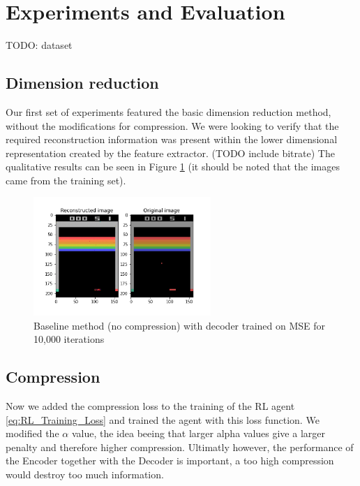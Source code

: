 \section{Experiments and Evaluation}
TODO: dataset
\subsection{Dimension reduction}
Our first set of experiments featured the basic dimension reduction method,
without the modifications for compression. We were looking to verify that the
required reconstruction information was present within the lower dimensional
representation created by the feature extractor. (TODO include bitrate) The
qualitative results can be seen in Figure \ref{fig:baseline_MSE} (it should be
noted that the images came from the training set). \\

\begin{figure}[H]
    \centering
    \includegraphics[width=0.6\textwidth]{images/orig_reconstructed0.0.png}
    \caption{Baseline method (no compression) with decoder trained on MSE for 10,000 iterations}
    \label{fig:baseline_MSE}
\end{figure}


\subsection{Compression}
Now we added the compression loss to the training of the RL agent
\ref{eq:RL_Training_Loss} and trained the agent with this loss function. We
modified the $\alpha$ value, the idea beeing that larger alpha values give a
larger penalty and therefore higher compression. Ultimatly however, the
performance of the Encoder together with the Decoder is important, a too high
compression would destroy too much information. %

